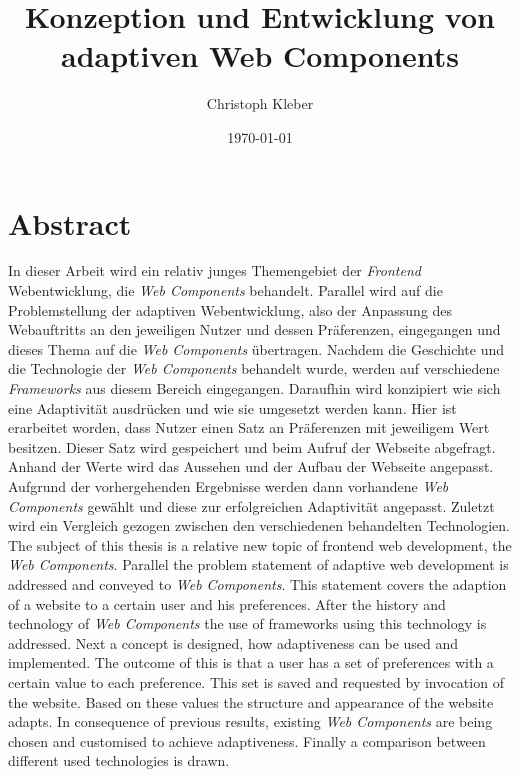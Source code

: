 \documentclass[12pt, paper=a4, bibtotoc, toc=listof, headsepline=true]{scrreprt}
\title{Konzeption und Entwicklung von adaptiven Web Components}
\author{Christoph Kleber}
\date{\today}
\newcommand{\listoflistings}{\listof{listing}{Listing Verzeichnis}}
\begin{document}
\maketitle

\chapter*{Abstract}
In dieser Arbeit wird ein relativ junges Themengebiet der \emph{Frontend} Webentwicklung, die \emph{Web Components} behandelt. Parallel wird auf die Problemstellung der adaptiven Webentwicklung, also der Anpassung des Webauftritts an den jeweiligen Nutzer und dessen Präferenzen, eingegangen und dieses Thema auf die \emph{Web Components} übertragen. Nachdem die Geschichte und die Technologie der \emph{Web Components} behandelt wurde, werden auf verschiedene \emph{Frameworks} aus diesem Bereich eingegangen. Daraufhin wird konzipiert wie sich eine Adaptivität ausdrücken und wie sie umgesetzt werden kann. Hier ist erarbeitet worden, dass Nutzer einen Satz an Präferenzen mit jeweiligem Wert besitzen. Dieser Satz wird gespeichert und beim Aufruf der Webseite abgefragt. Anhand der Werte wird das Aussehen und der Aufbau der Webseite angepasst. Aufgrund der vorhergehenden Ergebnisse werden dann vorhandene \emph{Web Components} gewählt und diese zur erfolgreichen Adaptivität angepasst. Zuletzt wird ein Vergleich gezogen zwischen den verschiedenen behandelten Technologien.     
\newline
\newline
The subject of this thesis is a relative new topic of frontend web development, the \emph{Web Components}. Parallel the problem statement of adaptive web development is addressed and conveyed to \emph{Web Components}. This statement covers the adaption of a website to a certain user and his preferences. After the history and technology of \emph{Web Components} the use of frameworks using this technology is addressed. Next a concept is designed, how adaptiveness can be used and implemented. The outcome of this is that a user has a set of preferences with a certain value to each preference. This set is saved and requested by invocation of the website. Based on these values the structure and appearance of the website adapts. In consequence of previous results, existing \emph{Web Components} are being chosen and customised to achieve adaptiveness. Finally a comparison between different used technologies is drawn.    
\listoflistings
\listoffigures
\end{document}
